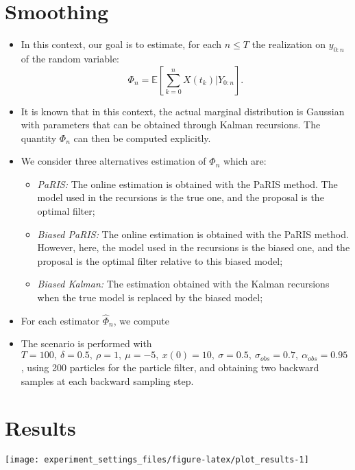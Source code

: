 \documentclass[]{article}
\providecommand{\tightlist}{%
  \setlength{\itemsep}{0pt}\setlength{\parskip}{0pt}}
\begin{document}
\hypertarget{smoothing}{%
\section{Smoothing}\label{smoothing}}

\begin{itemize}
\item
  In this context, our goal is to estimate, for each \(n\leq T\) the
  realization on \(y_{0:n}\) of the random variable:
  \[\Phi_n = \mathbb{E}\left[\sum_{k = 0}^{n} X(t_k)\vert Y_{0:n}\right].\]
\item
  It is known that in this context, the actual marginal distribution is
  Gaussian with parameters that can be obtained through Kalman
  recursions. The quantity \(\Phi_n\) can then be computed explicitly.
\item
  We consider three alternatives estimation of \(\Phi_n\) which are:

  \begin{itemize}
  \tightlist
  \item
    \emph{PaRIS:} The online estimation is obtained with the PaRIS
    method. The model used in the recursions is the true one, and the
    proposal is the optimal filter;
  \item
    \emph{Biased PaRIS:} The online estimation is obtained with the
    PaRIS method. However, here, the model used in the recursions is the
    biased one, and the proposal is the optimal filter relative to this
    biased model;
  \item
    \emph{Biased Kalman:} The estimation obtained with the Kalman
    recursions when the true model is replaced by the biased model;
  \end{itemize}
\item
  For each estimator \(\hat{\Phi}_n\), we compute
\item
  The scenario is performed with
  \(T = 100,~\delta = 0.5,~\rho = 1,~\mu = -5,~x(0) = 10,~\sigma = 0.5,~\sigma_{obs} = 0.7,~\alpha_{obs} = 0.95\),
  using 200 particles for the particle filter, and obtaining two
  backward samples at each backward sampling step.
\end{itemize}

\hypertarget{results}{%
\section{Results}\label{results}}

\begin{center}\texttt{[image: experiment\_settings\_files/figure-latex/plot\_results-1]} \end{center}
\end{document}

